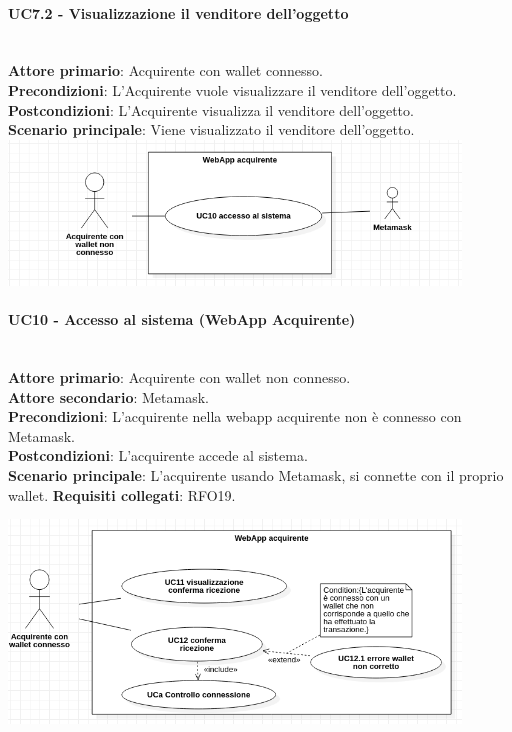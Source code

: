 \documentclass[a4paper, 12pt]{article}
\begin{document}
\paragraph{UC7.2 - Visualizzazione il venditore dell'oggetto}\\
\textbf{Attore primario}: Acquirente con wallet connesso.\\
\textbf{Precondizioni}: L'Acquirente vuole visualizzare il venditore dell'oggetto.\\
\textbf{Postcondizioni}: L'Acquirente visualizza il venditore dell'oggetto.\\
\textbf{Scenario principale}: Viene visualizzato il venditore dell'oggetto.\\

\includegraphics[width=0.9\textwidth]{UC_WAA1}


\paragraph{UC10 - Accesso al sistema (WebApp Acquirente)}\\
\textbf{Attore primario}: Acquirente con wallet non connesso.\\
\textbf{Attore secondario}: Metamask.\\
\textbf{Precondizioni}: L'acquirente nella webapp acquirente non è connesso con Metamask.\\
\textbf{Postcondizioni}: L'acquirente accede al sistema.\\
\textbf{Scenario principale}:
L'acquirente usando Metamask, si connette con il proprio wallet.
\textbf{Requisiti collegati}: RFO19.

\includegraphics[width=0.9\textwidth]{UC_WAA2}
\end{document}
